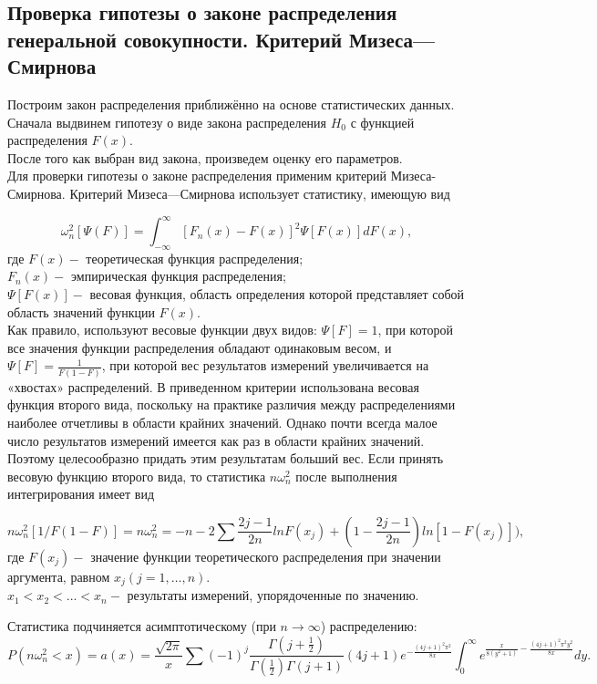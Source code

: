 \subsection{Проверка гипотезы о законе распределения генеральной совокупности. Критерий Мизеса—Смирнова}
Построим закон распределения приближённо на основе статистических данных. \\ 
Сначала выдвинем гипотезу о виде закона распределения $H_0$ с функцией распределения $F(x)$. \\ 
После того как выбран вид закона, произведем оценку его параметров. \\
Для проверки гипотезы о законе распределения применим критерий Мизеса-Смирнова. Критерий Мизеса—Смирнова использует статистику, имеющую вид

\begin{equation} \label{eq:omega} 
 \omega_n^2[\Psi(F)] = \int_{-\infty}^{\infty} [F_n(x)-F(x)]^2\Psi[F(x)]dF(x),
\end{equation}
где $F(x)-$ теоретическая функция распределения;\\
$F_n(x)-$ эмпирическая функция распределения;\\
$\Psi[F(x)]-$ весовая функция, область определения которой представляет собой область значений функции $F(x)$. \\
Как правило, используют весовые функции двух видов: $\Psi[F]=1$, при которой все значения функции распределения обладают одинаковым весом, и  $\Psi[F]=\frac{1}{F(1-F)}$, при которой вес результатов измерений увеличивается на «хвостах» распределений. В приведенном критерии использована весовая функция второго вида, поскольку на практике различия между распределениями наиболее отчетливы в области крайних значений. Однако почти всегда малое число результатов измерений имеется как раз в области крайних значений. Поэтому целесообразно придать этим результатам больший вес. Если принять весовую функцию второго вида, то статистика $n\omega_n^2$ после выполнения интегрирования имеет вид 

\begin{equation} \label{eq:Г1}
  n\omega_n^2[1/F(1-F)] = n\omega_n^2 = -n -2\sum  {\frac{2j-1}{2n} lnF(x_j) + (1-\frac{2j-1}{2n})ln[1-F(x_j)])},
\end{equation}
где $F(x_j) -$ значение функции теоретического распределения при значении аргумента, равном $x_j(j=1, …, n)$. \\
$x_1 < x_2 < ...< x_n - $ результаты измерений, упорядоченные по значению.


Статистика подчиняется асимптотическому (при $n \rightarrow{} \infty $) распределению:
\begin{equation} \label{eq:P}
  P(n\omega_n^2 < x) = a(x) = \frac{\sqrt{2\pi}}{x} \sum (-1)^j \frac{\Gamma(j +\frac{1}{2})}{\Gamma(\frac{1}{2})\Gamma(j+1)} (4j+1) e^{-\frac{(4j+1)^2\pi^2}{8x}} \int_0^\infty e^{\frac{x}{8(y^2+1)}-\frac{(4j+1)^2\pi^2y^2}{8x}} dy.
\end{equation}


